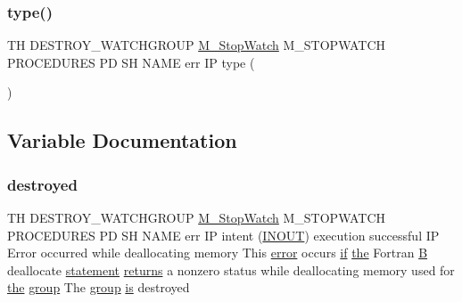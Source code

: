 \mbox{\label{destroy__watchgroup_83_8txt_ab623f536d615ff3d6357e73f12566b46}} 
\subsubsection{\texorpdfstring{type()}{type()}}
{\footnotesize\ttfamily TH D\+E\+S\+T\+R\+O\+Y\+\_\+\+W\+A\+T\+C\+H\+G\+R\+O\+UP \hyperlink{option__stopwatch_83_8txt_aa2011fc45a5e502e87ee50996a8a9305}{M\+\_\+\+Stop\+Watch} M\+\_\+\+S\+T\+O\+P\+W\+A\+T\+CH P\+R\+O\+C\+E\+D\+U\+R\+ES PD SH N\+A\+ME err IP type (\begin{DoxyParamCaption}\item[{watchgroup}]{ }\end{DoxyParamCaption})}



\subsection{Variable Documentation}
\mbox{\label{destroy__watchgroup_83_8txt_aa8895bfb33bae6c686314ee89dc98fa2}} 
\subsubsection{\texorpdfstring{destroyed}{destroyed}}
{\footnotesize\ttfamily TH D\+E\+S\+T\+R\+O\+Y\+\_\+\+W\+A\+T\+C\+H\+G\+R\+O\+UP \hyperlink{option__stopwatch_83_8txt_aa2011fc45a5e502e87ee50996a8a9305}{M\+\_\+\+Stop\+Watch} M\+\_\+\+S\+T\+O\+P\+W\+A\+T\+CH P\+R\+O\+C\+E\+D\+U\+R\+ES PD SH N\+A\+ME err IP intent (\hyperlink{M__stopwatch_83_8txt_aac11c70dd588f9c3fe71e95dbe89902f}{I\+N\+O\+UT}) execution successful IP Error occurred while deallocating memory This \hyperlink{M__stopwatch_83_8txt_ac4611edff506351be87ddb9adfc62315}{error} occurs \hyperlink{exit_87_8txt_a77395982f8d25581c808c40f3b634d90}{if} \hyperlink{M__stopwatch_83_8txt_a0f266597de2e57eb3aa964927bb30e14}{the} Fortran \hyperlink{intro__blas1_83_8txt_a5f157716d3fd55e7b7e08312dc859b58}{B} deallocate \hyperlink{M__stopwatch_83_8txt_a43758526aa61bbaa49faf1e287658350}{statement} \hyperlink{M__stopwatch_83_8txt_aee54cdd5349bf498aa96e7f9426a0717}{returns} a nonzero status while deallocating memory used for \hyperlink{M__stopwatch_83_8txt_a0f266597de2e57eb3aa964927bb30e14}{the} \hyperlink{M__stopwatch_83_8txt_a80fa32a76a22835e3c85462b2803875c}{group} The \hyperlink{M__stopwatch_83_8txt_a80fa32a76a22835e3c85462b2803875c}{group} \hyperlink{intro__blas1_83_8txt_a42a91df93f840595de3019ceb5d1df23}{is} destroyed}

